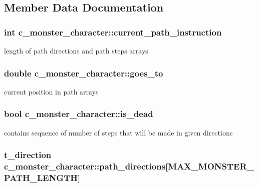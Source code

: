 \subsection{Member Data Documentation}
\hypertarget{classc__monster__character_a26c7d28a5741c7b99caf7ec9acb80872}{
\subsubsection[{current\-\_\-path\-\_\-instruction}]{\setlength{\rightskip}{0pt plus 5cm}int c\-\_\-monster\-\_\-character\-::current\-\_\-path\-\_\-instruction\hspace{0.3cm}{\ttfamily [protected]}}}\label{classc__monster__character_a26c7d28a5741c7b99caf7ec9acb80872}
length of path directions and path steps arrays \hypertarget{classc__monster__character_a4918cf31bdf7a308f57cc924fd48cd49}{
\subsubsection[{goes\-\_\-to}]{\setlength{\rightskip}{0pt plus 5cm}double c\-\_\-monster\-\_\-character\-::goes\-\_\-to\hspace{0.3cm}{\ttfamily [protected]}}}\label{classc__monster__character_a4918cf31bdf7a308f57cc924fd48cd49}
current position in path arrays \hypertarget{classc__monster__character_abea3e334122c075498889efb7a476b58}{
\subsubsection[{is\-\_\-dead}]{\setlength{\rightskip}{0pt plus 5cm}bool c\-\_\-monster\-\_\-character\-::is\-\_\-dead\hspace{0.3cm}{\ttfamily [protected]}}}\label{classc__monster__character_abea3e334122c075498889efb7a476b58}
contains sequence of number of steps that will be made in given directions \hypertarget{classc__monster__character_a6182d1b0f70221c2fdde578cdee0d6e2}{
\subsubsection[{path\-\_\-directions}]{\setlength{\rightskip}{0pt plus 5cm}t\-\_\-direction c\-\_\-monster\-\_\-character\-::path\-\_\-directions\mbox{[}M\-A\-X\-\_\-\-M\-O\-N\-S\-T\-E\-R\-\_\-\-P\-A\-T\-H\-\_\-\-L\-E\-N\-G\-T\-H\mbox{]}\hspace{0.3cm}{\ttfamily [protected]}}}\label{classc__monster__character_a6182d1b0f70221c2fdde578cdee0d6e2}
